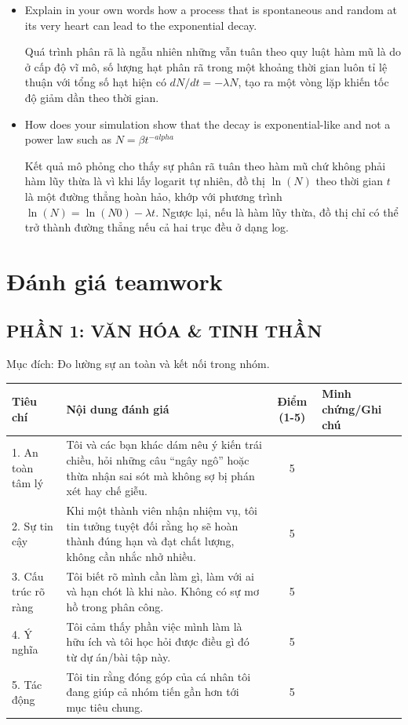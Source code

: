 \documentclass{article}
\begin{document}
\begin{itemize}
\item Explain in your own words how a process that is spontaneous and random at its very heart can lead to the exponential decay.

    Quá trình phân rã là ngẫu nhiên những vẫn tuân theo quy luật hàm mũ là do ở cấp độ vĩ mô, số lượng hạt phân rã trong một khoảng thời gian luôn tỉ lệ thuận với tổng số hạt hiện có \(dN/dt=-\lambda N\), tạo ra một vòng lặp khiến tốc độ giảm dần theo thời gian.
\item How does your simulation show that the decay is exponential-like and not a power law such as \(N = \beta t^{-alpha}\)

    Kết quả mô phỏng cho thấy sự phân rã tuân theo hàm mũ chứ không phải hàm lũy thừa là vì khi lấy logarit tự nhiên, đồ thị \(\ln(N)\) theo thời gian \(t\) là một đường thẳng hoàn hảo, khớp với phương trình \(\ln(N) = \ln(N0) - \lambda t\). Ngược lại, nếu là hàm lũy thừa, đồ thị chỉ có thể trở thành đường thẳng nếu cả hai trục đều ở dạng log.
\end{itemize}

\section{Đánh giá teamwork}

\subsection{PHẦN 1: VĂN HÓA \& TINH THẦN}
\noindent Mục đích: Đo lường sự an toàn và kết nối trong nhóm.

\begin{tabularx}{\textwidth}{|l|X|c|X|}
\hline
\textbf{Tiêu chí} & \textbf{Nội dung đánh giá} & \textbf{Điểm (1-5)} & \textbf{Minh chứng/Ghi chú} \\ \hline
1. An toàn tâm lý & Tôi và các bạn khác dám nêu ý kiến trái chiều, hỏi những câu ``ngây ngô'' hoặc thừa nhận sai sót mà không sợ bị phán xét hay chế giễu. & 5 & \\ \hline
2. Sự tin cậy & Khi một thành viên nhận nhiệm vụ, tôi tin tưởng tuyệt đối rằng họ sẽ hoàn thành đúng hạn và đạt chất lượng, không cần nhắc nhở nhiều. & 5 & \\ \hline
3. Cấu trúc rõ ràng & Tôi biết rõ mình cần làm gì, làm với ai và hạn chót là khi nào. Không có sự mơ hồ trong phân công. & 5 & \\ \hline
4. Ý nghĩa & Tôi cảm thấy phần việc mình làm là hữu ích và tôi học hỏi được điều gì đó từ dự án/bài tập này. & 5 & \\ \hline
5. Tác động & Tôi tin rằng đóng góp của cá nhân tôi đang giúp cả nhóm tiến gần hơn tới mục tiêu chung. & 5 & \\ \hline
\end{tabularx}
\end{document}
